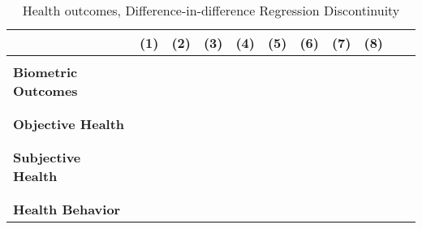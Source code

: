 
\begin{landscape}

\begin{table}[htp] \begin{adjustwidth}{-2cm}{}

 \centering  \vspace{-1cm} 
\def\sym#1{\ifmmode^{#1}\else\(^{#1}\)\fi}
\vspace*{\fill}
\caption{Health outcomes, Difference-in-difference Regression Discontinuity}\label{tab:Healthoutcomes_DDRD}

\begin{tabular}{l*{10}{c}}
\toprule
 &\multicolumn{1}{c}{(1)}&\multicolumn{1}{c}{(2)}&\multicolumn{1}{c}{(3)}&\multicolumn{1}{c}{(4)}&\multicolumn{1}{c}{(5)}&\multicolumn{1}{c}{(6)}&\multicolumn{1}{c}{(7)}&\multicolumn{1}{c}{(8)}\\ 
\midrule\\

\textbf{Biometric Outcomes}\\

	
	\midrule
	
	\\ \\
	\textbf{Objective Health}\\
        
        
     
     \midrule
     
	\\ \\
	\textbf{Subjective Health}\\
	         
        
     
     \midrule
     
	\\ \\
	\textbf{Health Behavior}\\
        
     
     \midrule
     
     \bottomrule
\end{tabular}
\vspace*{\fill}


\end{adjustwidth}
\end{table}
\end{landscape}
